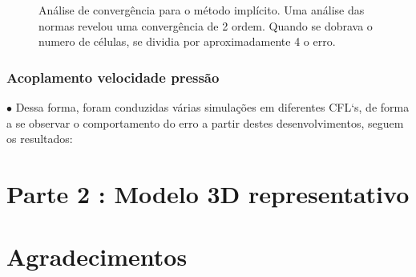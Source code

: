 \documentclass[xcolor=dvipsnames,10pt,aspectratio=169]{beamer}
\begin{document}
\begin{frame}
\begin{minipage}[h!]{0.49\textwidth}
\begin{figure}[h!]
	\caption{ Análise de convergência para o método implícito. Uma análise das normas revelou uma convergência de 2 ordem. Quando se dobrava o numero de células, se dividia por aproximadamente 4 o erro.}
\end{figure}
\end{minipage}
\end{frame}






\begin{frame} 
\frametitle{Acoplamento velocidade pressão }
$\bullet$ Dessa forma, foram conduzidas várias simulações em diferentes CFL`s, de forma a se observar o comportamento do erro a partir destes desenvolvimentos, seguem os resultados: \\


\end{frame}


	
	

	
	\section{Parte 2 : Modelo 3D representativo}
	
	

	
	
	\section{Agradecimentos}
		
		
		
		
		
\end{document}

